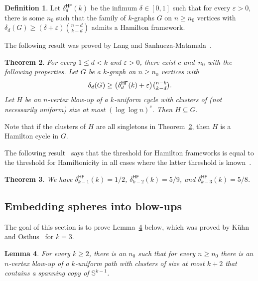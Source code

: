 \documentclass[12pt,reqno]{amsart}
\theoremstyle{plain}
\newtheorem{theorem}{Theorem}[section]
\newtheorem{lemma}[theorem]{Lemma}
\theoremstyle{definition}
\newtheorem{definition}[theorem]{Definition}
\numberwithin{equation}{section}
\newcommand{\eps}{\varepsilon}
\renewcommand{\subset}{\subseteq}
\DeclareMathOperator{\hf}{\mathsf{HF}}
\begin{document}
	\begin{definition}\label{def:ham-fw-threshold}
		Let $\delta_d^{\hf}(k)$ be the infimum $\delta \in [0,1]$ such that for every $\eps>0$, there is some $n_0$ such that the family of $k$-graphs $G$ on $n \geq n_0$ vertices with $\delta_d(G) \geq (\delta + \eps ) \binom{n-d}{k-d}$ admits a Hamilton framework.
	\end{definition}
	
	The following result was proved by Lang and Sanhueza-Matamala~\cite[Theorem 1.1]{LS24a}.
	
	\begin{theorem}\label{thm:framework-bandwidth-simple}
		For every $1 \leq d < k$ and $\eps >0$, there exist $c$ and~$n_0$ with the following properties.
		Let $G$ be a $k$-graph on $n\geq n_0$ vertices with \[\delta_d(G) \geq \big(\delta_d^{\hf}(k) + \eps \big) \tbinom{n-k}{k-d}.\]
		Let $H$ be an $n$-vertex blow-up of a $k$-uniform cycle with clusters of (not necessarily uniform) size at most $(\log \log n)^c$.
		Then $H \subset G$.
	\end{theorem}
	
	Note that if the clusters of $H$ are all singletons in Theorem~\ref{thm:framework-bandwidth-simple}, then $H$ is a Hamilton cycle in $G$.
	
	The following result~\cite[Theorem 2.8]{LS24a} says that the threshold for Hamilton frameworks is equal to the threshold for Hamiltonicity in all cases where the latter threshold is known~\cite{LS22,LSV24,PRR+20,RRS08a}.
	
	\begin{theorem}\label{thm:thresholds}
		We have $\delta_{k-1}^{\hf}(k) = 1/2$, $\delta_{k-2}^{\hf}(k) = 5/9$, and $\delta_{k-3}^{\hf}(k) = 5/8$.
	\end{theorem}
	
	\subsection{Embedding spheres into blow-ups}\label{sec:sphere-into-blow-up}
	
	The goal of this section is to prove Lemma~\ref{lem:spheres-in-blow-ups} below, which was proved by Kühn and Osthus~\cite{KO05} for $k=3$.
	
	\begin{lemma}\label{lem:spheres-in-blow-ups}
		For every $k \geq 2$, there is an $n_0$ such that for every $n\geq n_0$ there is an $n$-vertex blow-up of a $k$-uniform path with clusters of size at most $k+2$ that contains a spanning copy of $\mathbb{S}^{k-1}$.
	\end{lemma}
	
\end{document}
